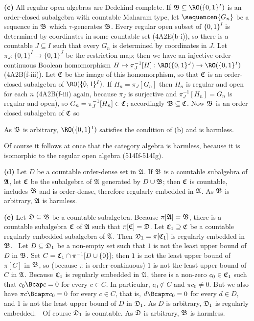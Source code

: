 {\medskip

{\bf (c)} All regular open algebras are Dedekind complete.
If $\frak B\subseteq\RO(\{0,1\}^I)$ is an order-closed subalgebra with
countable
Maharam type, let $\sequencen{G_n}$ be a sequence in $\frak B$ which
$\tau$-generates $\frak B$.   Every regular open subset of $\{0,1\}^I$ is
determined by coordinates in some countable set (4A2E(b-i)), so there is a
countable $J\subseteq I$ such that every $G_n$ is determined by coordinates
in $J$.   Let $\pi_J:\{0,1\}^I\to\{0,1\}^J$ be the restriction map;  then
we have an injective order-continuous Boolean homomorphism
$H\mapsto\pi_J^{-1}[H]:\RO(\{0,1\}^J)\to\RO(\{0,1\}^I)$
(4A2B(f-iii)).   Let $\frak C$ be the
image of this homomorphism, so that $\frak C$ is an order-closed subalgebra of
$\RO(\{0,1\}^I)$.   If $H_n=\pi_J[G_n]$
then $H_n$ is regular and open for each $n$ (4A2B(f-iii) again, because $\pi_J$
is surjective and $\pi_J^{-1}[H_n]=G_n$ is regular and open), so
$G_n=\pi_J^{-1}[H_n]\in\frak C$;  accordingly $\frak B\subseteq\frak C$.   Now
$\frak B$ is an order-closed subalgebra of $\frak C$ so


\noindent As $\frak B$ is arbitrary, $\RO(\{0,1\}^I)$ satisfies the
condition of (b) and is harmless.

Of course it follows at once that the category algebra is harmless, because
it is isomorphic to the regular open algebra (514If-514Ig).

\medskip

{\bf (d)} Let $D$ be a countable order-dense set in $\frak A$.   If $\frak B$ is a
countable subalgebra of $\frak A$, let $\frak C$ be the subalgebra of $\frak A$
generated by $D\cup\frak B$;  then $\frak C$ is countable, includes $\frak B$ and is
order-dense, therefore regularly embedded in $\frak A$.   As $\frak B$ is arbitrary,
$\frak A$ is harmless.

\medskip

{\bf (e)} Let $\frak D\subseteq\frak B$ be a countable subalgebra.   Because
$\pi[\frak A]=\frak B$, there is a countable subalgebra $\frak C$ of $\frak A$ such
that $\pi[\frak C]=\frak D$.   Let $\frak C_1\supseteq\frak C$ be a countable
regularly embedded subalgebra of $\frak A$.   Then
$\frak D_1=\pi[\frak C_1]$ is regularly
embedded in $\frak B$.   \Prf\ Let $D\subseteq\frak D_1$ be a non-empty set such
that $1$ is not the least upper bound of $D$ in $\frak B$.   Set
$C=\frak C_1\cap\pi^{-1}[D\cup\{0\}]$;  then $1$ is not the least upper bound of
$\pi[C]$ in $\frak B$, so (because $\pi$ is order-continuous)
$1$ is not the least upper bound of $C$ in $\frak A$.
Because $\frak C_1$ is regularly embedded in $\frak A$, there is a non-zero
$c_0\in\frak C_1$ such that $c_0\Bcap c=0$ for every $c\in C$.   In particular,
$c_0\notin C$ and $\pi c_0\ne 0$.   But we also have $\pi c\Bcap\pi c_0=0$ for every
$c\in C$, that is, $d\Bcap\pi c_0=0$ for every $d\in D$, and $1$ is not the least
upper bound of $D$ in $\frak D_1$.   As $D$ is arbitrary, $\frak D_1$ is regularly
embedded.\ \QeD\   Of course $\frak D_1$ is countable.   As $\frak D$ is arbitrary,
$\frak B$ is harmless.

}
